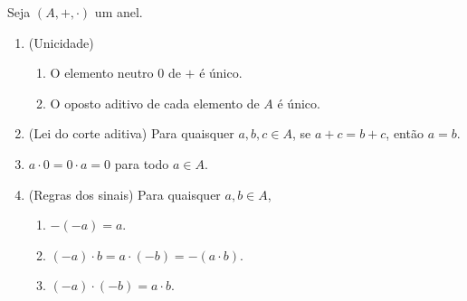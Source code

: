\begin{proposition}
    Seja $(A,+, \cdot)$ um anel.
        \begin{enumerate}[leftmargin=*, align=left, label=\textbf{(\alph*)}]
            \item (Unicidade)
                \begin{enumerate}[label=\roman*.]
                    \item O elemento neutro $0$ de $+$ é único.
                    \item O oposto aditivo de cada elemento de $A$ é único.
                \end{enumerate}
            \item (Lei do corte aditiva) Para quaisquer $a, b, c \in A$, se $a+c = b+c$, então $a=b$.
            \item $a \cdot 0 = 0 \cdot a = 0$ para todo $a \in A$.
            \item (Regras dos sinais) Para quaisquer $a,b \in A$,
                \begin{enumerate}[label=\roman*.]
                    \item $-(-a) = a$.
                    \item $(-a) \cdot b = a \cdot (-b) = - (a \cdot b)$.
                    \item $(-a) \cdot (-b) = a \cdot b$.
                \end{enumerate}
        \end{enumerate}
\end{proposition}

